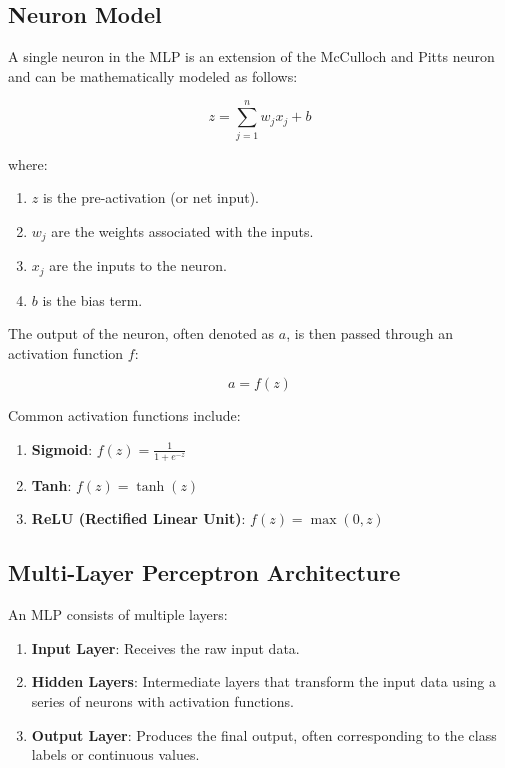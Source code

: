 \documentclass[english]{article}
\begin{document}
\subsection{Neuron Model}
A single neuron in the MLP is an extension of the McCulloch and Pitts neuron and can be mathematically modeled as follows:

\begin{equation}
    z = \sum_{j=1}^{n} w_j x_j + b
\end{equation}

where:
\begin{enumerate}[label=]
\item \( z \) is the pre-activation (or net input).
\item \( w_j \) are the weights associated with the inputs.
\item \( x_j \) are the inputs to the neuron.
\item \( b \) is the bias term.
\end{enumerate}
The output of the neuron, often denoted as \( a \), is then passed through an activation function \( f \):

\begin{equation}
    a = f(z)
\end{equation}

Common activation functions include:
\begin{enumerate}[label=]
    \item \textbf{Sigmoid}: \( f(z) = \frac{1}{1 + e^{-z}} \)
    \item \textbf{Tanh}: \( f(z) = \tanh(z) \)
    \item \textbf{ReLU (Rectified Linear Unit)}: \( f(z) = \max(0, z) \)
\end{enumerate}

\subsection{Multi-Layer Perceptron Architecture}
An MLP consists of multiple layers:
\begin{enumerate}
    \item \textbf{Input Layer}: Receives the raw input data.
    \item \textbf{Hidden Layers}: Intermediate layers that transform the input data using a series of neurons with activation functions.
    \item \textbf{Output Layer}: Produces the final output, often corresponding to the class labels or continuous values.
\end{enumerate}
\end{document}
